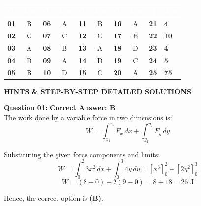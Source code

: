\documentclass[11pt,a4paper]{article}
\begin{document}
\begin{center}
\renewcommand{\arraystretch}{1.25}
\small
\begin{tabularx}{\textwidth}{|>{\centering\arraybackslash}c|>{\centering\arraybackslash}c|>{\centering\arraybackslash}c|>{\centering\arraybackslash}c|>{\centering\arraybackslash}c|>{\centering\arraybackslash}c|>{\centering\arraybackslash}c|>{\centering\arraybackslash}c|>{\centering\arraybackslash}c|>{\centering\arraybackslash}X|}
\hline
\rowcolor{tableDarkHeader}
\textcolor{white}{\textbf{Q.}} & \textcolor{white}{\textbf{Ans}} & \textcolor{white}{\textbf{Q.}} & \textcolor{white}{\textbf{Ans}} & \textcolor{white}{\textbf{Q.}} & \textcolor{white}{\textbf{Ans}} & \textcolor{white}{\textbf{Q.}} & \textcolor{white}{\textbf{Ans}} & \textcolor{white}{\textbf{Q.}} & \textcolor{white}{\textbf{Ans}} \\
\hline
\rowcolor{white}
\textbf{01} & B & \textbf{06} & A & \textbf{11} & B & \textbf{16} & A & \textbf{21} & \textbf{4} \\
\hline
\rowcolor{tableStripe}
\textbf{02} & C & \textbf{07} & C & \textbf{12} & C & \textbf{17} & B & \textbf{22} & \textbf{10} \\
\hline
\rowcolor{white}
\textbf{03} & A & \textbf{08} & B & \textbf{13} & A & \textbf{18} & D & \textbf{23} & \textbf{4} \\
\hline
\rowcolor{tableStripe}
\textbf{04} & D & \textbf{09} & A & \textbf{14} & D & \textbf{19} & C & \textbf{24} & \textbf{5} \\
\hline
\rowcolor{white}
\textbf{05} & B & \textbf{10} & D & \textbf{15} & C & \textbf{20} & A & \textbf{25} & \textbf{75} \\
\hline
\end{tabularx}
\end{center}

\vspace{10pt}

\begin{tcolorbox}[sectionbanner]
  {\large \textbf{\textsf{HINTS \& STEP-BY-STEP DETAILED SOLUTIONS}}}
\end{tcolorbox}
\vspace{6pt}

\begin{tcolorbox}[solbox]
\textbf{\textcolor{primaryDark}{Question 01:}} \hfill \textbf{\textcolor{l1Green}{Correct Answer: B}}\\
\vspace{4pt}
The work done by a variable force in two dimensions is:
$$W = \int_{x_1}^{x_2} F_x\, dx + \int_{y_1}^{y_2} F_y\, dy$$

Substituting the given force components and limits:
$$W = \int_{0}^{2} 3x^2\, dx + \int_{0}^{3} 4y\, dy = \left[ x^3 \right]_{0}^{2} + \left[ 2y^2 \right]_{0}^{3}$$
$$W = (8 - 0) + 2(9 - 0) = 8 + 18 = 26\text{ J}$$

Hence, the correct option is \textbf{(B)}.
\end{tcolorbox}
\end{document}
